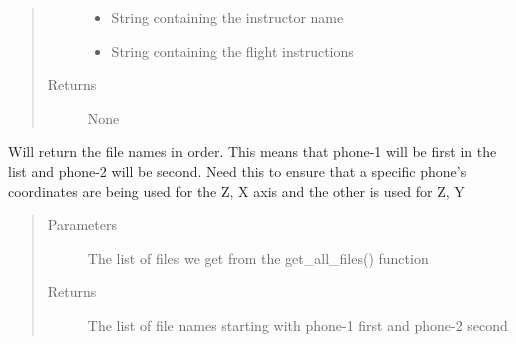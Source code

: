 \documentclass[letterpaper,10pt,english]{sphinxmanual}
\begin{document}
\begin{fulllineitems}
\begin{fulllineitems}
\begin{quote}
\begin{description}
\begin{itemize}
\item {} 
 \textendash{} String containing the instructor name

\item {} 
 \textendash{} String containing the flight instructions

\end{itemize}

\item[{Returns}] \leavevmode
None

\end{description}\end{quote}

\end{fulllineitems}


\begin{fulllineitems}
\label{\detokenize{index:src.Controllers.Program_Controller.Controller.get_in_order}}
Will return the file names in order. This means that phone-1 will be first in the list and
phone-2 will be second. Need this to ensure that a specific phone’s coordinates are being
used for the Z, X axis and the other is used for Z, Y
\begin{quote}\begin{description}
\item[{Parameters}] \leavevmode
{} \textendash{} The list of files we get from the get\_all\_files() function

\item[{Returns}] \leavevmode
The list of file names starting with phone-1 first and phone-2 second

\end{description}\end{quote}

\end{fulllineitems}



\end{fulllineitems}
\end{document}
